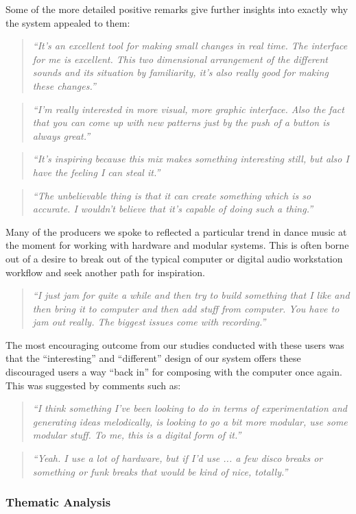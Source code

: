 Some of the more detailed positive remarks give further insights into exactly why the system appealed to them:

\blockquote{\textit{“It's an excellent tool for making small changes in real time. The interface for me is excellent. This two dimensional arrangement of the different sounds and its situation by familiarity, it's also really good for making these changes.”}}

\blockquote{\textit{“I'm really interested in more visual, more graphic interface. Also the fact that you can come up with new patterns just by the push of a button is always great.”}}

\blockquote{\textit{“It's inspiring because this mix makes something interesting still, but also I have the feeling I can steal it.”}}

\blockquote{\textit{“The unbelievable thing is that it can create something which is so accurate. I wouldn't believe that it's capable of doing such a thing.”}}

Many of the producers we spoke to reflected a particular trend in dance music at the moment for working with hardware and modular systems. This is often borne out of a desire to break out of the typical computer or digital audio workstation workflow and seek another path for inspiration.

\blockquote{\textit{“I just jam for quite a while and then try to build something that I like and then bring it to computer and then add stuff from computer. You have to jam out really. The biggest issues come with recording.”}}

The most encouraging outcome from our studies conducted with these users was that the “interesting” and “different” design of our system offers these discouraged users a way “back in” for composing with the computer once again. This was suggested by comments such as:

\blockquote{\textit{“I think something I've been looking to do in terms of experimentation and generating ideas melodically, is looking to go a bit more modular, use some modular stuff. To me, this is a digital form of it.”}}

\blockquote{\textit{“Yeah. I use a lot of hardware, but if I'd use ... a few disco breaks or something or funk breaks that would be kind of nice, totally.”}}

\subsubsection{Thematic Analysis}

